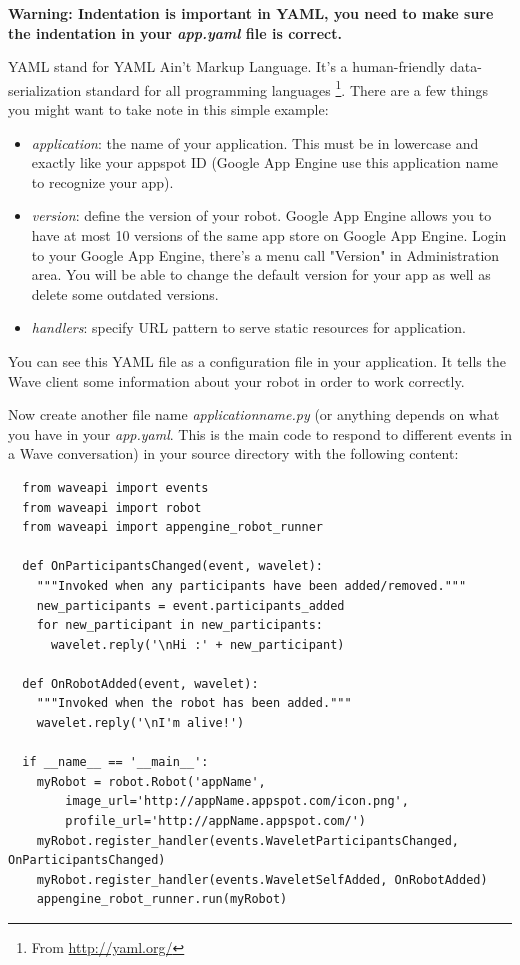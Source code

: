 \textbf{Warning: Indentation is important in YAML, you need to make sure the indentation
in your {\em app.yaml} file is correct.}

YAML stand for YAML Ain't Markup Language. It's a human-friendly
data-serialization standard for all programming
languages \footnote{From \url{http://yaml.org/}}.  There are a few
things you might want to take note in this simple example:

\begin{itemize}
\item {\em application}: the name of your application. This must be in 
lowercase and exactly like your appspot ID (Google App Engine use this
application name to recognize your app).
  
\item {\em version}: define the version of your robot. Google App Engine 
allows you to have at most 10 versions of the same app store on Google
App Engine. Login to your Google App Engine, there's a menu call
"Version" in Administration area. You will be able to change the
default version for your app as well as delete some outdated versions.

\item {\em handlers}: specify URL pattern to serve static resources for application.
\end{itemize}

You can see this YAML file as a configuration file in your
application. It tells the Wave client some information about your
robot in order to work correctly.

Now create another file name {\em applicationname.py} (or anything
depends on what you have in your {\em app.yaml}. This is the main code
to respond to different events in a Wave conversation) in your source
directory with the following content:

\begin{verbatim}
  from waveapi import events
  from waveapi import robot
  from waveapi import appengine_robot_runner

  def OnParticipantsChanged(event, wavelet):
    """Invoked when any participants have been added/removed."""
    new_participants = event.participants_added
    for new_participant in new_participants:
      wavelet.reply('\nHi :' + new_participant)

  def OnRobotAdded(event, wavelet):
    """Invoked when the robot has been added."""
    wavelet.reply('\nI'm alive!')

  if __name__ == '__main__':
    myRobot = robot.Robot('appName', 
        image_url='http://appName.appspot.com/icon.png',
        profile_url='http://appName.appspot.com/')
    myRobot.register_handler(events.WaveletParticipantsChanged, OnParticipantsChanged)
    myRobot.register_handler(events.WaveletSelfAdded, OnRobotAdded)
    appengine_robot_runner.run(myRobot)
\end{verbatim}

